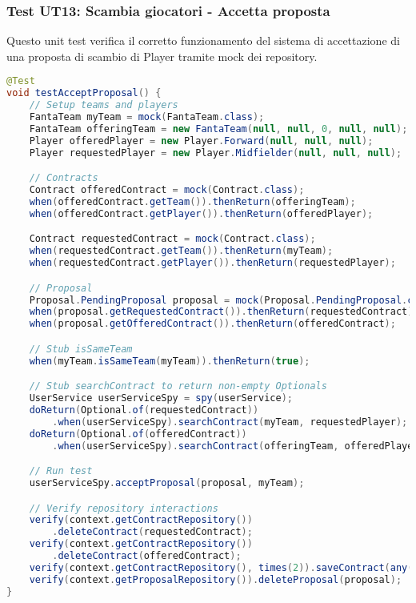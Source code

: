 \subsubsection{Test UT13: Scambia giocatori - Accetta proposta} \label{UT13}

Questo unit test verifica il corretto funzionamento del sistema di accettazione di una proposta di scambio di Player 
tramite mock dei repository.

\begin{lstlisting}[language=Java]
@Test
void testAcceptProposal() {
	// Setup teams and players
	FantaTeam myTeam = mock(FantaTeam.class);
	FantaTeam offeringTeam = new FantaTeam(null, null, 0, null, null);
	Player offeredPlayer = new Player.Forward(null, null, null);
	Player requestedPlayer = new Player.Midfielder(null, null, null);

	// Contracts
	Contract offeredContract = mock(Contract.class);
	when(offeredContract.getTeam()).thenReturn(offeringTeam);
	when(offeredContract.getPlayer()).thenReturn(offeredPlayer);

    Contract requestedContract = mock(Contract.class);
    when(requestedContract.getTeam()).thenReturn(myTeam);
	when(requestedContract.getPlayer()).thenReturn(requestedPlayer);

	// Proposal
	Proposal.PendingProposal proposal = mock(Proposal.PendingProposal.class);
	when(proposal.getRequestedContract()).thenReturn(requestedContract);
	when(proposal.getOfferedContract()).thenReturn(offeredContract);

	// Stub isSameTeam
	when(myTeam.isSameTeam(myTeam)).thenReturn(true);

	// Stub searchContract to return non-empty Optionals
	UserService userServiceSpy = spy(userService);
	doReturn(Optional.of(requestedContract))
        .when(userServiceSpy).searchContract(myTeam, requestedPlayer);
	doReturn(Optional.of(offeredContract))
        .when(userServiceSpy).searchContract(offeringTeam, offeredPlayer);

	// Run test
	userServiceSpy.acceptProposal(proposal, myTeam);

	// Verify repository interactions
	verify(context.getContractRepository())
        .deleteContract(requestedContract);
	verify(context.getContractRepository())
        .deleteContract(offeredContract);
	verify(context.getContractRepository(), times(2)).saveContract(any(Contract.class));
	verify(context.getProposalRepository()).deleteProposal(proposal);
}
\end{lstlisting}


